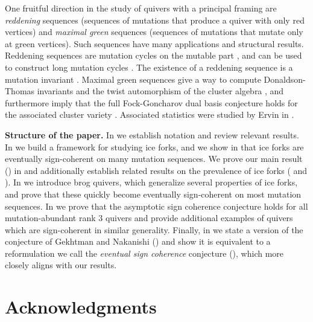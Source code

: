 \documentclass[12pt]{amsart}
\theoremstyle{definition}
\theoremstyle{remark}
\numberwithin{equation}{section}
\begin{document}
One fruitful direction in the study of quivers with a principal framing are \emph{reddening} sequences (sequences of mutations that produce a quiver with only red vertices) and \emph{maximal green} sequences (sequences of mutations that mutate only at green vertices).
Such sequences have many applications and structural results.
Reddening sequences are mutation cycles on the mutable part \cite{BDP}, and can be used to construct long mutation cycles \cite{MCR}. The existence of a reddening sequence is a mutation invariant \cite{Muller_2016}.
Maximal green sequences give a way to compute Donaldson-Thomas invariants and the twist automorphism of the cluster algebra \cite{KellerGreenSurvey}, and furthermore imply that the full Fock-Goncharov dual basis conjecture holds for the associated cluster variety \cite{GHKK}.
Associated statistics were studied by Ervin in \cite{ErvinRS}.%

 


\textbf{Structure of the paper.} 
In  we establish notation and review relevant results. 
In  we build a framework for studying ice forks, and we show in  that ice forks are eventually sign-coherent on many mutation sequences.
We prove our main result () in  and additionally establish related results on the prevalence of ice forks ( and ).
In  we introduce brog quivers, which generalize several properties of ice forks, and prove that these quickly become eventually sign-coherent on most mutation sequences. In  we prove that the asymptotic sign coherence conjecture holds for all mutation-abundant rank $3$ quivers and provide additional examples of quivers which are sign-coherent in similar generality.  Finally, in  we state a version of the conjecture of Gekhtman and Nakanishi () and show it is equivalent to a reformulation we call the \emph{eventual sign coherence} conjecture (), which more closely aligns with our results. %



\section*{Acknowledgments}
\end{document}
